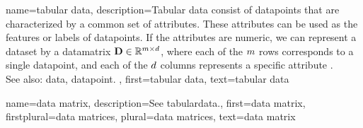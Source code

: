 {name={tabular data},
	description={Tabular \gls{data} consist of \glspl{datapoint} 
		that are characterized by a common set of attributes. These attributes 
		can be used as the \glspl{feature} or \glspl{label} of \glspl{datapoint}. 
		If the attributes are numeric, we can represent a \gls{dataset} by 
		a \gls{datamatrix} $\mathbf{D} \in \mathbb{R}^{m \times d}$, 
		where each of the $m$ rows corresponds to a single \gls{datapoint},
		and each of the $d$ columns represents a specific attribute \cite{Everitt2022}.
		\\
		See also: \gls{data}, \gls{datapoint}. }, 
	first={tabular data},
	text={tabular data}
}

{name={data matrix},
	description={See \gls{tabulardata}.}, 
	first={data matrix},
	firstplural={data matrices},
	plural={data matrices},
	text={data matrix}
}
		
